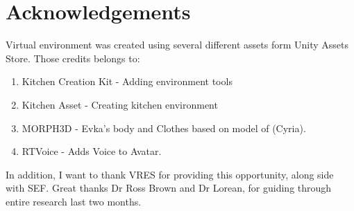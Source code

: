 \documentclass[18pt]{article}
\numberwithin{equation}{section} %
\numberwithin{figure}{section} %
\numberwithin{table}{section} %
\begin{document}
\section{Acknowledgements}	
	Virtual environment was created using several different assets form Unity Assets Store. Those credits belongs to: 
	\begin{enumerate}
		\item Kitchen Creation Kit - Adding environment tools
		\item Kitchen Asset - Creating kitchen environment
		\item MORPH3D - Evka's body and Clothes based on model of (Cyria).
		\item RTVoice - Adds Voice to Avatar.
	\end{enumerate}
	
	In addition, I want to thank VRES for providing this opportunity, along side with SEF. Great thanks Dr Ross Brown and Dr Lorean, for guiding through entire research last two months. \\	
	
\newpage
\begin{flushleft}



\end{flushleft}
\end{document}
